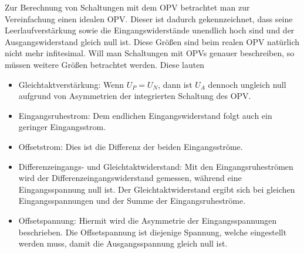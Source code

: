 Zur Berechnung von Schaltungen mit dem OPV betrachtet man zur Vereinfachung einen idealen OPV. 
Dieser ist dadurch gekennzeichnet, dass seine Leerlaufverstärkung sowie die Eingangswiderstände unendlich hoch
sind und der Ausgangswiderstand gleich null ist. Diese Größen sind beim realen OPV natürlich
nicht mehr infitesimal. Will man Schaltungen mit OPVs genauer beschreiben,
so müssen weitere Größen betrachtet werden. Diese lauten
\begin{itemize}
 \item Gleichtaktverstärkung: Wenn $U_P = U_N$, dann ist $U_A$ dennoch ungleich null aufgrund von Asymmetrien 
 der integrierten Schaltung des OPV.
 \item Eingangsruhestrom: Dem endlichen Eingangswiderstand folgt auch ein geringer Eingangsstrom.
 \item Offsetstrom: Dies ist die Differenz der beiden Eingangsströme.
 \item Differenzeingangs- und Gleichtaktwiderstand: Mit den Eingangsruheströmen wird der Differenzeingangswiderstand
 gemessen, während eine Eingangsspannung null ist. Der Gleichtaktwiderstand ergibt sich bei gleichen Eingangsspannungen
 und der Summe der Eingangsruheströme.
 \item Offsetspannung: Hiermit wird die Asymmetrie der Eingangsspannungen beschrieben. Die Offsetspannung ist diejenige
 Spannung, welche eingestellt werden muss, damit die Ausgangsspannung gleich null ist.
 \end{itemize}
